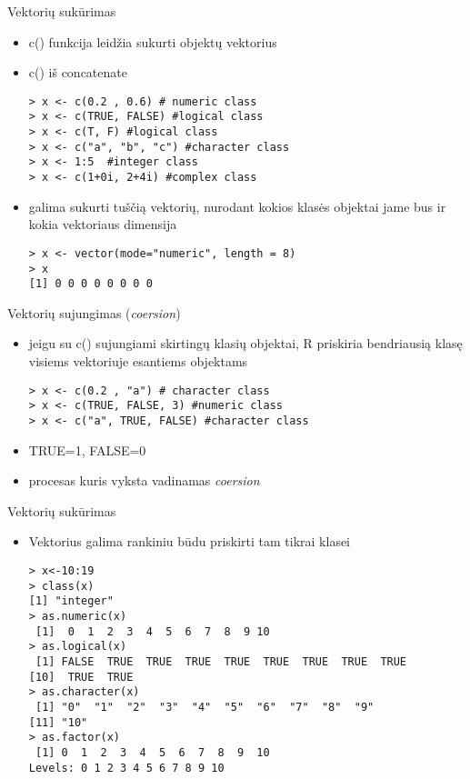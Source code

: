 \documentclass[11pt,xcolor=table]{beamer}
\begin{document}

\begin{frame}[fragile]{Vektorių sukūrimas}

\begin{itemize}
\item c() funkcija leidžia sukurti objektų vektorius 
\item c() iš concatenate 
\begin{lstlisting}
> x <- c(0.2 , 0.6) # numeric class
> x <- c(TRUE, FALSE) #logical class
> x <- c(T, F) #logical class
> x <- c("a", "b", "c") #character class
> x <- 1:5  #integer class
> x <- c(1+0i, 2+4i) #complex class
\end{lstlisting}
\item galima sukurti tuščią vektorių, nurodant kokios klasės objektai jame bus ir kokia vektoriaus dimensija
\begin{lstlisting}
> x <- vector(mode="numeric", length = 8)
> x
[1] 0 0 0 0 0 0 0 0
\end{lstlisting}
\end{itemize}
\end{frame}


\begin{frame}[fragile]{Vektorių sujungimas (\textit{coersion})}
\begin{itemize}
\item jeigu su c() sujungiami skirtingų klasių objektai, R priskiria bendriausią klasę visiems vektoriuje esantiems objektams
\begin{lstlisting}
> x <- c(0.2 , "a") # character class
> x <- c(TRUE, FALSE, 3) #numeric class
> x <- c("a", TRUE, FALSE) #character class
\end{lstlisting}
\item TRUE=1, FALSE=0
\item procesas kuris vyksta vadinamas \textit{coersion}
\end{itemize}
\end{frame}


\begin{frame}[fragile]{Vektorių sukūrimas}
\begin{itemize}
\item Vektorius galima rankiniu būdu priskirti tam tikrai klasei 
\begin{lstlisting}
> x<-10:19
> class(x)
[1] "integer"
> as.numeric(x)
 [1]  0  1  2  3  4  5  6  7  8  9 10
> as.logical(x)
 [1] FALSE  TRUE  TRUE  TRUE  TRUE  TRUE  TRUE  TRUE  TRUE
[10]  TRUE  TRUE
> as.character(x)
 [1] "0"  "1"  "2"  "3"  "4"  "5"  "6"  "7"  "8"  "9" 
[11] "10"
> as.factor(x)
 [1] 0  1  2  3  4  5  6  7  8  9  10
Levels: 0 1 2 3 4 5 6 7 8 9 10
\end{lstlisting}
\end{itemize}
\end{frame}
\end{document}
